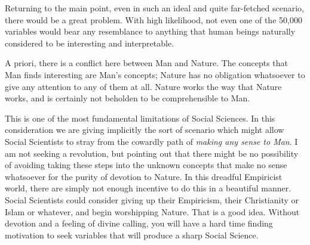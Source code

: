 \documentclass{amsart}
\begin{document}
Returning to the main point, even in such an ideal and quite far-fetched scenario, there would be a great problem.  With high likelihood, not even one of the 50,000 variables would bear any resemblance to anything that human beings naturally considered to be interesting and interpretable.

A priori, there is a conflict here between Man and Nature.  The concepts that Man finds interesting are Man's concepts; Nature has no obligation whatsoever to give any attention to any of them at all.  Nature works the way that Nature works, and is certainly not beholden to be comprehensible to Man.

This is one of the most fundamental limitations of Social Sciences.  In this consideration we are giving implicitly the sort of scenario which might allow Social Scientists to stray from the cowardly path of {\em making any sense to Man}.  I am not seeking a revolution, but pointing out that there might be no possibility of avoiding taking these steps into the unknown concepts that make no sense whatsoever for the purity of devotion to Nature.  In this dreadful Empiricist world, there are simply not enough incentive to do this in a beautiful manner.  Social Scientists could consider giving up their Empiricism, their Christianity or Islam or whatever, and begin worshipping Nature.  That is a good idea.  Without devotion and a feeling of divine calling, you will have a hard time finding motivation to seek variables that will produce a sharp Social Science.
\end{document}
